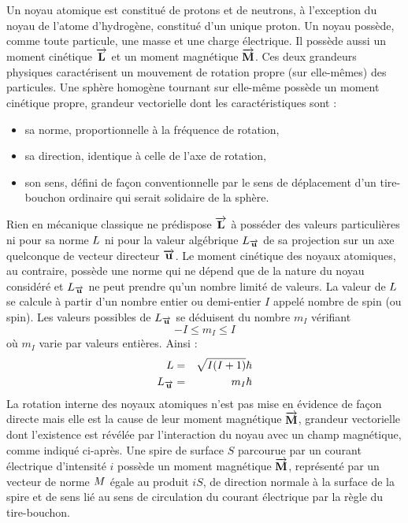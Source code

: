 Un noyau atomique est constitué de protons et de neutrons, à l'exception du noyau de
l'atome d'hydrogène, constitué d'un unique proton.
Un noyau possède, comme toute particule, une masse et une charge électrique.
Il possède aussi un moment cinétique $\overrightarrow{\mathbf{L}}$ 
et un moment magnétique $\overrightarrow{\mathbf{M}}$.
Ces deux grandeurs physiques caractérisent
un mouvement de rotation propre (sur elle-mêmes) des particules.
Une sphère homogène tournant sur elle-même possède un moment cinétique propre,
grandeur vectorielle dont les caractéristiques sont :
\begin{itemize}
\item sa norme, proportionnelle à la fréquence de rotation,
\item sa direction, identique à celle de l'axe de rotation,
\item son sens, défini de façon conventionnelle par le sens de déplacement d'un tire-
bouchon ordinaire qui serait solidaire de la sphère.
\end{itemize}
Rien en mécanique classique ne prédispose $\overrightarrow{\mathbf{L}}$ à posséder des valeurs
particulières ni pour sa norme $L$ ni pour la valeur algébrique $L_{\overrightarrow{\mathbf{u}}}$ de sa
projection sur un axe quelconque de vecteur directeur $\overrightarrow{\mathbf{u}}$.
Le moment cinétique des noyaux atomiques, au contraire, possède une
norme qui ne dépend que de la nature du noyau considéré et $L_{\overrightarrow{\mathbf{u}}}$ ne peut
prendre qu'un nombre limité de valeurs.
La valeur de $L$ se calcule à partir d'un
nombre entier ou demi-entier $I$ appelé nombre de spin (ou spin).
Les valeurs possibles de $L_{\overrightarrow{\mathbf{u}}}$ se déduisent du nombre $m_I$ vérifiant
\begin{equation}
-I \le m_I \le I
\end{equation}
où $m_I$ varie par valeurs entières. Ainsi :
\begin{eqnarray}
L & = & \sqrt{I(I+1)}\hbar \\
L_{\overrightarrow{\mathbf{u}}} & = & m_I \hbar
\end{eqnarray}
La rotation interne des noyaux atomiques n'est pas mise en évidence de façon
directe mais elle est la cause de leur moment magnétique $\overrightarrow{\mathbf{M}}$,
grandeur vectorielle dont l'existence est révélée par l'interaction du noyau avec un
champ magnétique, comme indiqué ci-après.
Une spire de surface $S$ parcourue par un courant électrique d'intensité $i$ possède un
moment magnétique $\overrightarrow{\mathbf{M}}$,
représenté par un vecteur de norme $M$ égale au produit $iS$, de
direction normale à la surface de la spire et de
sens lié au sens de circulation du courant
électrique par la règle du tire-bouchon.

